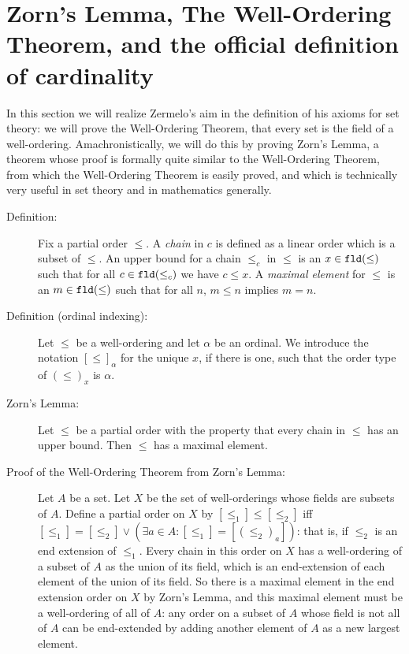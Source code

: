 \documentclass[12pt]{book}
\begin{document}
\newpage

\section{Zorn's Lemma, The Well-Ordering Theorem, and the official definition of cardinality}

In this section we will realize Zermelo's aim in the definition of his axioms for set theory:  we will prove the Well-Ordering Theorem, that every set is the field of a well-ordering.  Amachronistically, we will do this by proving Zorn's Lemma, a theorem whose proof is formally quite similar to the Well-Ordering Theorem, from which the Well-Ordering Theorem is easily proved, and which is technically very useful in set theory and in mathematics generally.

\begin{description}

\item[Definition:]  Fix a partial order $\leq$.  A {\em chain\/} in $c$ is defined as a linear order which is a subset of $\leq$.  An upper bound for a chain $\leq_c$ in $\leq$ is an $x \in {\tt fld}(\leq)$ such that for all $c \in {\tt fld}(\leq_c)$ we have $c \leq x$.  A {\em maximal element\/} for $\leq$ is
an $m \in {\tt fld}(\leq)$ such that for all $n$, $m \leq n$ implies $m=n$.

\item[Definition (ordinal indexing):]  Let $\leq$ be a well-ordering and let $\alpha$ be an ordinal.  We introduce the notation $[\leq]_{\alpha}$ for the unique $x$, if there is one, such that
the order type of $(\leq)_x$ is $\alpha$.

\item[Zorn's Lemma:]  Let $\leq$ be a partial order with the property that every chain in $\leq$ has an upper bound.  Then $\leq$ has a maximal element.

\item[Proof of the Well-Ordering Theorem from Zorn's Lemma:]  Let $A$ be a set.
Let $X$ be the set of well-orderings whose fields are subsets of $A$.  Define a partial order on $X$ by $[\leq_1] \leq [\leq_2]$ iff
$[\leq_1]=[\leq_2] \vee (\exists a \in A:[\leq_1]=[(\leq_2)_a])$:  that is, if $\leq_2$ is an end extension of $\leq_1$.  Every chain in this order on $X$ has a well-ordering of a subset of $A$ as the  union of its field, which is an end-extension of each element of the union of its field.  So there is a maximal element in the end extension order on $X$ by Zorn's Lemma, and this maximal element must be a well-ordering of all of $A$:  any order on a subset of $A$ whose field is not all of $A$ can be end-extended by adding another element of $A$ as a new largest element.


\end{description}
\end{document}
